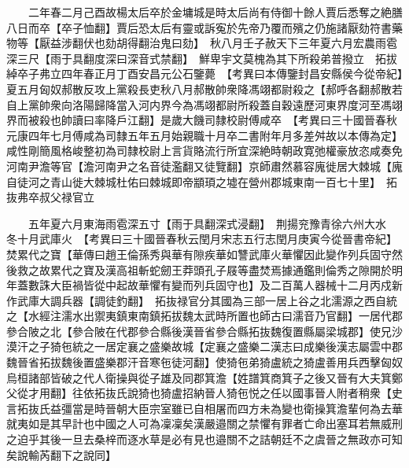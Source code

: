 　　二年春二月己酉故楊太后卒於金墉城是時太后尚有侍御十餘人賈后悉奪之絶膳八日而卒【卒子恤翻】賈后恐太后有靈或訴寃於先帝乃覆而殯之仍施諸厭劾符書藥物等【厭益涉翻伏也劾胡得翻治鬼曰劾】　秋八月壬子赦天下三年夏六月宏農雨雹深三尺【雨于具翻度深曰深音式禁翻】　鮮卑宇文莫槐為其下所殺弟普撥立　拓拔綽卒子弗立四年春正月丁酉安昌元公石鑒薨　【考異曰本傳鑒封昌安縣侯今從帝紀】　夏五月匈奴郝散反攻上黨殺長吏秋八月郝散帥衆降馮翊都尉殺之【郝呼各翻郝散若自上黨帥衆向洛陽歸降當入河内界今為馮翊都尉所殺蓋自穀遠歷河東界度河至馮翊界而被殺也帥讀曰率降戶江翻】是歲大饑司隸校尉傅咸卒　【考異曰三十國晉春秋元康四年七月傅咸為司隸五年五月始親職十月卒二書附年月多差舛故以本傳為定】咸性剛簡風格峻整初為司隸校尉上言貨賂流行所宜深絶時朝政寛弛權豪放恣咸奏免河南尹澹等官【澹河南尹之名音徒濫翻又徒覽翻】京師肅然慕容廆徙居大棘城【廆自徒河之青山徙大棘城杜佑曰棘城即帝顓頊之墟在營州郡城東南一百七十里】　拓抜弗卒叔父禄官立

　　五年夏六月東海雨雹深五寸【雨于具翻深式浸翻】　荆揚兖豫青徐六州大水　冬十月武庫火　【考異曰三十國晉春秋云閏月宋志五行志閏月庚寅今從晉書帝紀】焚累代之寶【華傳曰趙王倫孫秀與華有隙疾華如讐武庫火華懼因此變作列兵固守然後救之故累代之寶及漢高祖斬蛇劒王莽頭孔子屐等盡焚焉據通鑑則倫秀之隙開於明年蓋數誅大臣禍皆從中起故華懼有變而列兵固守也】及二百萬人器械十二月丙戍新作武庫大調兵器【調徒釣翻】　拓抜禄官分其國為三部一居上谷之北濡源之西自統之【水經注濡水出禦夷鎮東南鎮拓拔魏太武時所置也師古曰濡音乃官翻】一居代郡參合陂之北【參合陂在代郡參合縣後漢晉省參合縣拓抜魏復置縣屬梁城郡】使兄沙漠汗之子猗㐌統之一居定襄之盛樂故城【定襄之盛樂二漢志曰成樂後漢志屬雲中郡魏晉省拓拔魏後置盛樂郡汗音寒㐌徒河翻】使猗㐌弟猗盧統之猗盧善用兵西擊匈奴烏桓諸部皆破之代人衛操與從子雄及同郡箕澹【姓譜箕商箕子之後又晉有大夫箕鄭父從才用翻】往依拓抜氏說猗也猗盧招納晉人猗㐌悦之任以國事晉人附者稍衆【史言拓抜氏益彊當是時晉朝大臣宗室雖已自相屠而四方未為變也衛操箕澹輩何為去華就夷如是其早計也中國之人可為凜凜矣漢嚴邉關之禁懼有罪者亡命出塞耳若無威刑之迫乎其後一旦去桑梓而逐水草是必有見也邉關不之詰朝廷不之虞晉之無政亦可知矣說輸芮翻下之說同】

